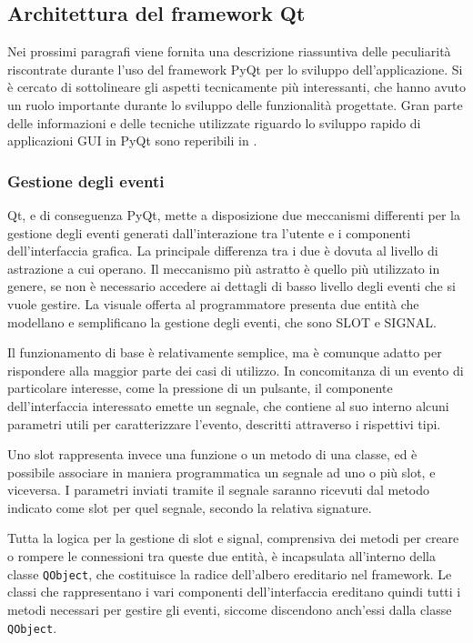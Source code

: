 \subsection{Architettura del framework Qt}

Nei prossimi paragrafi viene fornita una descrizione riassuntiva delle peculiarità riscontrate durante l'uso del framework PyQt per lo sviluppo dell'applicazione. Si è cercato di sottolineare gli aspetti tecnicamente più interessanti, che hanno avuto un ruolo importante durante lo sviluppo delle funzionalità progettate. Gran parte delle informazioni e delle tecniche utilizzate riguardo lo sviluppo rapido di applicazioni GUI in PyQt sono reperibili in \cite{summerfield}.

\subsubsection{Gestione degli eventi}

Qt, e di conseguenza PyQt, mette a disposizione due meccanismi differenti per la gestione degli eventi generati dall'interazione tra l'utente e i componenti dell'interfaccia grafica. La principale differenza tra i due è dovuta al livello di astrazione a cui operano. Il meccanismo più astratto è quello più utilizzato in genere, se non è necessario accedere ai dettagli di basso livello degli eventi che si vuole gestire. La visuale offerta al programmatore presenta due entità che modellano e semplificano la gestione degli eventi, che sono SLOT e SIGNAL. 

Il funzionamento di base è relativamente semplice, ma è comunque adatto per rispondere alla maggior parte dei casi di utilizzo. In concomitanza di un evento di particolare interesse, come la pressione di un pulsante, il componente dell'interfaccia interessato emette un segnale, che contiene al suo interno alcuni parametri utili per caratterizzare l'evento, descritti attraverso i rispettivi tipi. 

Uno slot rappresenta invece una funzione o un metodo di una classe, ed è possibile associare in maniera programmatica un segnale ad uno o più slot, e viceversa. I parametri inviati tramite il segnale saranno ricevuti dal metodo indicato come slot per quel segnale, secondo la relativa signature. 

Tutta la logica per la gestione di slot e signal, comprensiva dei metodi per creare o rompere le connessioni tra queste due entità, è incapsulata all'interno della classe \verb|QObject|, che costituisce la radice dell'albero ereditario nel framework. Le classi che rappresentano i vari componenti dell'interfaccia ereditano quindi tutti i metodi necessari per gestire gli eventi, siccome discendono anch'essi dalla classe \verb|QObject|. 

